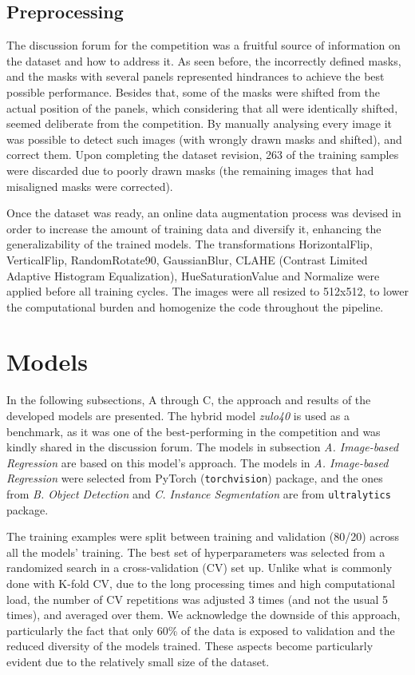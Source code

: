 \documentclass[conference]{IEEEtran}
\begin{document}
\subsection{Preprocessing}

The discussion forum for the competition was a fruitful source of information on the dataset and how to address it. As seen before, the incorrectly defined masks, and the masks with several panels represented hindrances to achieve the best possible performance. Besides that, some of the masks were shifted from the actual position of the panels, which considering that all were identically shifted, seemed deliberate from the competition. By manually analysing every image  it was possible to detect such images (with wrongly drawn masks and shifted), and correct them. Upon completing the dataset revision, 263 of the training samples were discarded due to poorly drawn masks (the remaining images that had misaligned masks were corrected).

Once the dataset was ready, an online data augmentation process was devised in order to increase the amount of training data and diversify it, enhancing the generalizability of the trained models. The transformations HorizontalFlip, VerticalFlip, RandomRotate90, GaussianBlur, CLAHE (Contrast Limited Adaptive Histogram Equalization), HueSaturationValue and Normalize were applied before all training cycles. The images were all resized to 512x512, to lower the computational burden and homogenize the code throughout the pipeline. 

\section{Models}

In the following subsections, A through C, the approach and results of the developed models are presented. The hybrid model \textit{zulo40} is used as a benchmark, as it was one of the best-performing in the competition and was kindly shared in the discussion forum. The models in subsection \textit{A. Image-based Regression} are based on this model's approach. The models in \textit{A. Image-based Regression} were selected from PyTorch (\texttt{torchvision}) package, and the ones from \textit{B. Object Detection} and \textit{C. Instance Segmentation} are from \texttt{ultralytics} package.

The training examples were split between training and validation (80/20) across all the models' training. The best set of hyperparameters was selected from a randomized search in a cross-validation (CV) set up. Unlike what is commonly done with K-fold CV, due to the long processing times and high computational load, the number of CV repetitions was adjusted 3 times (and not the usual 5 times), and averaged over them. We acknowledge the downside of this approach, particularly the fact that only 60\% of the data is exposed to validation and the reduced diversity of the models trained. These aspects become particularly evident due to the relatively small size of the dataset.
\end{document}
